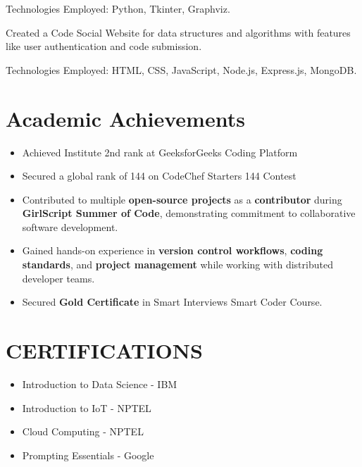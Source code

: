 \documentclass[]{deedy-resume-openfont}
\begin{document}
\begin{minipage}[t]{0.66\textwidth}
\begin{normalsize}
\begin{tightemize}
    \item Technologies Employed: Python, Tkinter, Graphviz.
\end{tightemize}
\end{normalsize}
\sectionsep

\begin{normalsize} %
\begin{tightemize}
    \item Created a Code Social Website for data structures and algorithms with features like user authentication and code submission.
    
    \item Technologies Employed: HTML, CSS, JavaScript, Node.js, Express.js, MongoDB.
\end{tightemize}
\end{normalsize}
\sectionsep





\section{Academic Achievements} 
\begin{normalsize} %
\begin{itemize}
    \item Achieved Institute 2nd rank at GeeksforGeeks Coding Platform
    \item Secured a global rank of 144 on CodeChef Starters 144 Contest
    \item Contributed to multiple \textbf{open-source projects} as a \textbf{contributor} during \textbf{GirlScript Summer of Code}, demonstrating commitment to collaborative software development.  
    \item Gained hands-on experience in \textbf{version control workflows}, \textbf{coding standards}, and \textbf{project management} while working with distributed developer teams.
    \item Secured \textbf{Gold Certificate} in Smart Interviews Smart Coder Course.
  

\end{itemize}
\end{normalsize}


  
 \section{CERTIFICATIONS} 
 \begin{itemize}
  \normalsize
  \item Introduction to Data Science - IBM
  \item Introduction to IoT - NPTEL
  \item Cloud Computing - NPTEL
  \item Prompting Essentials - Google
\end{itemize}


\end{minipage}
\end{document}
